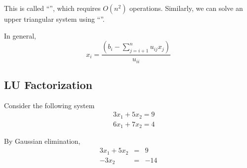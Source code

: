 This is called ``'', which requires $O(n^2)$ operations. Similarly, we can solve an upper triangular system using ``''.

\begin{theorem}
    In general, \[
        x_i = \frac{\displaystyle \left(b_i - \sum_{j=i+1}^{n} u_{ij} x_j\right)}{u_{ii}}
    \]
\end{theorem}

\newpage

\subsection{LU Factorization}

\begin{eg}
    Consider the following system
    \begin{eqnarray*}
        && 3x_1 + 5 x_2 = 9 \\
        && 6x_1 + 7x_2 = 4    
    \end{eqnarray*}
\end{eg}

By Gaussian elimination, 
\begin{eqnarray*}
    3x_1 +  5x_2 & =& 9 \\
    -3x_2 & = & -14 
\end{eqnarray*}

